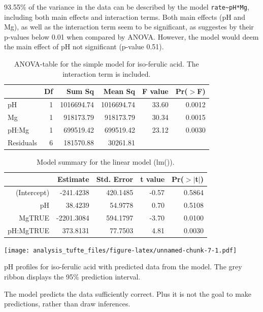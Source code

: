 \documentclass[]{tufte-handout}
\begin{document}
93.55\% of the variance in the data can be described by the model
\texttt{rate\textasciitilde{}pH*Mg}, including both main effects and
interaction terms. Both main effects (pH and Mg), as well as the
interaction term seem to be significant, as suggestes by their p-values
below 0.01 when compared by ANOVA. However, the model would deem the
main effect of pH not significant (p-value 0.51).

\begin{table}[ht]
\centering
\begin{tabular}{lrrrrr}
  \toprule
 & Df & Sum Sq & Mean Sq & F value & Pr($>$F) \\ 
  \midrule
pH          & 1 & 1016694.74 & 1016694.74 & 33.60 & 0.0012 \\ 
  Mg          & 1 & 918173.79 & 918173.79 & 30.34 & 0.0015 \\ 
  pH:Mg       & 1 & 699519.42 & 699519.42 & 23.12 & 0.0030 \\ 
  Residuals   & 6 & 181570.88 & 30261.81 &  &  \\ 
   \bottomrule
\end{tabular}
\caption{ANOVA-table for the simple model for iso-ferulic acid. The interaction term is included.} 
\end{table}\begin{table}[ht]
\centering
\begin{tabular}{rrrrr}
  \toprule
 & Estimate & Std. Error & t value & Pr($>$$|$t$|$) \\ 
  \midrule
(Intercept) & -241.4238 & 420.1485 & -0.57 & 0.5864 \\ 
  pH & 38.4239 & 54.9778 & 0.70 & 0.5108 \\ 
  MgTRUE & -2201.3084 & 594.1797 & -3.70 & 0.0100 \\ 
  pH:MgTRUE & 373.8131 & 77.7503 & 4.81 & 0.0030 \\ 
   \bottomrule
\end{tabular}
\caption{Model summary for the linear model (lm()).} 
\end{table}\begin{marginfigure}
 \texttt{[image: analysis\_tufte\_files/figure-latex/unnamed-chunk-7-1.pdf]}
\caption{pH profiles for iso-ferulic acid with predicted data from the model. The grey ribbon displays the 95\% prediction interval.}
\end{marginfigure}

The model predicts the data sufficiently correct. Plus it is not the
goal to make predictions, rather than draw inferences.
\end{document}
